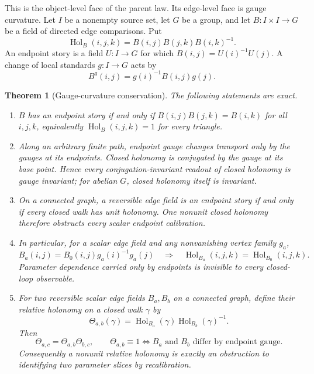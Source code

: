 \documentclass[11pt]{article}
\newtheorem{theorem}{Theorem}[section]
\theoremstyle{definition}
\theoremstyle{remark}
\begin{document}
This is the object-level face of the parent law.  Its edge-level face is
gauge curvature.  Let \(I\) be a nonempty source set, let \(G\) be a group,
and let \(B:I\times I\to G\) be a field of directed edge comparisons.  Put
\[
 \operatorname{Hol}_B(i,j,k)=B(i,j)B(j,k)B(i,k)^{-1}.
\tag{2.H0}\label{eq:triangle-holonomy}
\]
An endpoint story is a field \(U:I\to G\) for which
\(B(i,j)=U(i)^{-1}U(j)\).  A change of local standards \(g:I\to G\) acts by
\[
                       B^g(i,j)=g(i)^{-1}B(i,j)g(j).
\tag{2.H1}\label{eq:endpoint-gauge}
\]

\begin{theorem}[Gauge-curvature conservation]
\label{thm:gauge-curvature-conservation}
The following statements are exact.
\begin{enumerate}[label=\textup{(\roman*)},leftmargin=2.4em]
\item \(B\) has an endpoint story if and only if
      \(B(i,j)B(j,k)=B(i,k)\) for all \(i,j,k\), equivalently
      \(\operatorname{Hol}_B(i,j,k)=1\) for every triangle.
\item Along an arbitrary finite path, endpoint gauge changes transport only
      by the gauges at its endpoints.  Closed holonomy is conjugated by the
      gauge at its base point.  Hence every conjugation-invariant readout of
      closed holonomy is gauge invariant; for abelian \(G\), closed holonomy
      itself is invariant.
\item On a connected graph, a reversible edge field is an endpoint story if
      and only if every closed walk has unit holonomy.  One nonunit closed
      holonomy therefore obstructs every scalar endpoint calibration.
\item In particular, for a scalar edge field and any nonvanishing vertex
      family \(g_a\),
      \[
        B_a(i,j)=B_0(i,j)g_a(i)^{-1}g_a(j)
        \quad\Longrightarrow\quad
        \operatorname{Hol}_{B_a}(i,j,k)
        =\operatorname{Hol}_{B_0}(i,j,k).
      \tag{2.H2}\label{eq:separable-holonomy-blindness}
      \]
      Parameter dependence carried only by endpoints is invisible to every
      closed-loop observable.
\item For two reversible scalar edge fields \(B_a,B_b\) on a connected graph,
      define their relative holonomy on a closed walk \(\gamma\) by
      \[
        \Theta_{a,b}(\gamma)=
        \operatorname{Hol}_{B_a}(\gamma)
        \operatorname{Hol}_{B_b}(\gamma)^{-1}.
      \tag{2.H2a}\label{eq:parametric-holonomy-transgression}
      \]
      Then
      \[
        \Theta_{a,c}=\Theta_{a,b}\Theta_{b,c},\qquad
        \Theta_{a,b}\equiv1
        \Longleftrightarrow
        B_a\text{ and }B_b\text{ differ by endpoint gauge}.
      \tag{2.H2b}\label{eq:parametric-gauge-classification}
      \]
      Consequently a nonunit relative holonomy is exactly an obstruction to
      identifying two parameter slices by recalibration.
\end{enumerate}
\end{theorem}
\end{document}
